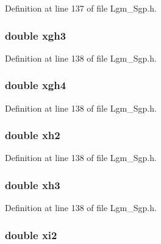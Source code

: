 Definition at line 137 of file Lgm\_\-Sgp.h.\hypertarget{struct___sgp_info_e49feebf68831d39731fa268baba51c1}{
\subsubsection[{xgh3}]{\setlength{\rightskip}{0pt plus 5cm}double {\bf xgh3}}}
\label{struct___sgp_info_e49feebf68831d39731fa268baba51c1}




Definition at line 138 of file Lgm\_\-Sgp.h.\hypertarget{struct___sgp_info_c1fc37ddfcd1eb053bb240d30083455d}{
\subsubsection[{xgh4}]{\setlength{\rightskip}{0pt plus 5cm}double {\bf xgh4}}}
\label{struct___sgp_info_c1fc37ddfcd1eb053bb240d30083455d}




Definition at line 138 of file Lgm\_\-Sgp.h.\hypertarget{struct___sgp_info_1ae6115c362e5b5450b515b208f46764}{
\subsubsection[{xh2}]{\setlength{\rightskip}{0pt plus 5cm}double {\bf xh2}}}
\label{struct___sgp_info_1ae6115c362e5b5450b515b208f46764}




Definition at line 138 of file Lgm\_\-Sgp.h.\hypertarget{struct___sgp_info_b8a252c46a5859f5f5f5f7a3bb0ed3b8}{
\subsubsection[{xh3}]{\setlength{\rightskip}{0pt plus 5cm}double {\bf xh3}}}
\label{struct___sgp_info_b8a252c46a5859f5f5f5f7a3bb0ed3b8}




Definition at line 138 of file Lgm\_\-Sgp.h.\hypertarget{struct___sgp_info_c3b4de799b764c0819cffc7166a2df10}{
\subsubsection[{xi2}]{\setlength{\rightskip}{0pt plus 5cm}double {\bf xi2}}}
\label{struct___sgp_info_c3b4de799b764c0819cffc7166a2df10}




